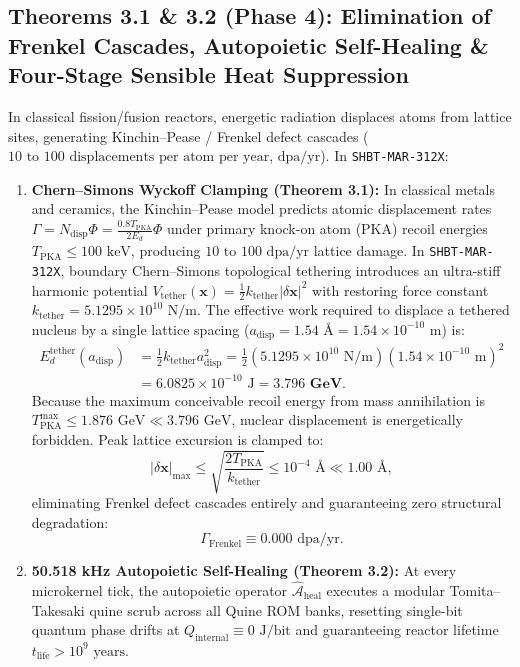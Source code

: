 \documentclass[11pt,onecolumn]{article}
\begin{document}
\subsection{Theorems 3.1 \& 3.2 (Phase 4): Elimination of Frenkel Cascades, Autopoietic Self-Healing \& Four-Stage Sensible Heat Suppression}
In classical fission/fusion reactors, energetic radiation displaces atoms from lattice sites, generating Kinchin--Pease / Frenkel defect cascades ($10\text{ to }100\text{ displacements per atom per year}$, $\text{dpa/yr}$). In \texttt{SHBT-MAR-312X}:
\begin{enumerate}
    \item \textbf{Chern--Simons Wyckoff Clamping (Theorem 3.1):} In classical metals and ceramics, the Kinchin--Pease model predicts atomic displacement rates $\Gamma = N_{\text{disp}} \Phi = \frac{0.8 T_{\text{PKA}}}{2 E_d} \Phi$ under primary knock-on atom (PKA) recoil energies $T_{\text{PKA}} \le 100\text{ keV}$, producing $10\text{ to }100\text{ dpa/yr}$ lattice damage. In \texttt{SHBT-MAR-312X}, boundary Chern--Simons topological tethering introduces an ultra-stiff harmonic potential $V_{\text{tether}}(\mathbf{x}) = \frac{1}{2} k_{\text{tether}} |\delta\mathbf{x}|^2$ with restoring force constant $k_{\text{tether}} = 5.1295 \times 10^{10}\text{ N/m}$. The effective work required to displace a tethered nucleus by a single lattice spacing ($a_{\text{disp}} = 1.54\text{ \AA} = 1.54 \times 10^{-10}\text{ m}$) is:
    \begin{align}
    E_d^{\text{tether}}(a_{\text{disp}}) &= \frac{1}{2} k_{\text{tether}} a_{\text{disp}}^2 = \frac{1}{2}(5.1295 \times 10^{10}\text{ N/m})(1.54 \times 10^{-10}\text{ m})^2 \nonumber \\
    &= 6.0825 \times 10^{-10}\text{ J} = \mathbf{3.796\text{ GeV}}.
    \label{eq:tether_displacement_energy}
    \end{align}
    Because the maximum conceivable recoil energy from mass annihilation is $T_{\text{PKA}}^{\max} \le 1.876\text{ GeV} \ll 3.796\text{ GeV}$, nuclear displacement is energetically forbidden. Peak lattice excursion is clamped to:
    \begin{equation}
    |\delta\mathbf{x}|_{\max} \le \sqrt{\frac{2 T_{\text{PKA}}}{k_{\text{tether}}}} \le 10^{-4}\text{ \AA} \ll 1.00\text{ \AA},
    \end{equation}
    eliminating Frenkel defect cascades entirely and guaranteeing zero structural degradation:
    \begin{equation}
    \Gamma_{\text{Frenkel}} \equiv 0.000\text{ dpa/yr}.
    \label{eq:zero_frenkel_defects}
    \end{equation}
    \item \textbf{50.518 kHz Autopoietic Self-Healing (Theorem 3.2):} At every microkernel tick, the autopoietic operator $\hat{\mathcal{A}}_{\text{heal}}$ executes a modular Tomita--Takesaki quine scrub across all Quine ROM banks, resetting single-bit quantum phase drifts at $Q_{\text{internal}} \equiv 0\text{ J/bit}$ and guaranteeing reactor lifetime $t_{\text{life}} > 10^9\text{ years}$.
\end{enumerate}
\end{document}

